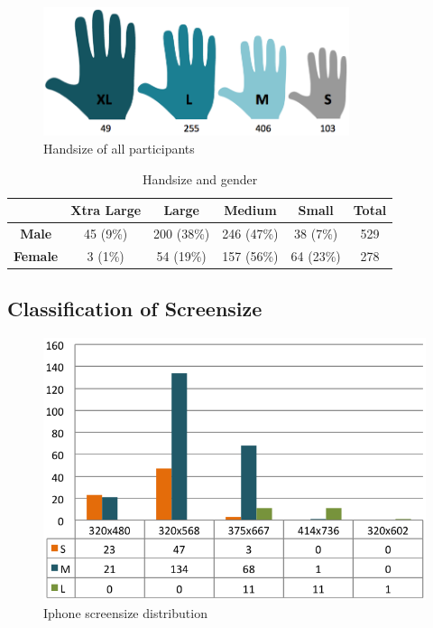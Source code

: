 		\begin{figure}[H]
      \centering
      \includegraphics[width=0.8\textwidth]{pics/analysis/handsize.png}
      \caption{Handsize of all participants}
      \label{fig:handsize}
    \end{figure}

    \begin{table}[H]
      \centering
      \begin{tabular}{ c || c | c | c | c || c }
        \hline
        & {\bf Xtra Large} & {\bf Large} & {\bf Medium} & {\bf Small} & {\bf Total}\\ \hline
        {\bf Male} & 45 (9\%) & 200 (38\%) & 246 (47\%) & 38 (7\%) & 529 \\
        {\bf Female} & 3 (1\%) & 54 (19\%) & 157 (56\%) & 64 (23\%) & 278 \\ \hline
      \end{tabular}
      \caption{Handsize and gender}
      \label{tab:HandsizeGender}
    \end{table}

  \clearpage
	\subsection{Classification of Screensize} \label{sec:classificationscreensize}

		\begin{figure}[H]
      \centering
      \includegraphics[scale=0.4]{pics/analysis/IphoneScreenDist.png}
      \caption{Iphone screensize distribution}
      \label{fig:iphoneScreenDist}
    \end{figure}
    
